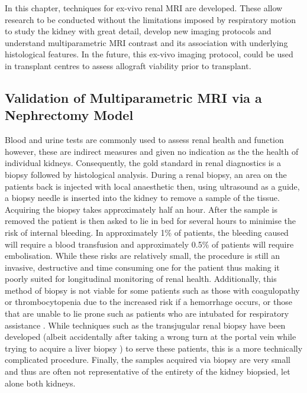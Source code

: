 In this chapter, techniques for ex-vivo renal \ac{MRI} are developed. These allow research to be conducted without the limitations imposed by respiratory motion to study the kidney with great detail, develop new imaging protocols and understand multiparametric \ac{MRI} contrast and its association with underlying histological features. In the future, this ex-vivo imaging protocol, could be used in transplant centres to assess allograft viability prior to transplant.

\subsection{Validation of Multiparametric MRI via a Nephrectomy Model}

Blood and urine tests are commonly used to assess renal health and function however, these are indirect measures and given no indication as the the health of individual kidneys. Consequently, the gold standard in renal diagnostics is a biopsy followed by histological analysis. During a renal biopsy, an area on the patients back is injected with local anaesthetic then, using ultrasound as a guide, a biopsy needle is inserted into the kidney to remove a sample of the tissue. Acquiring the biopsy takes approximately half an hour. After the sample is removed the patient is then asked to lie in bed for several hours to minimise the risk of internal bleeding. In approximately 1\% of patients, the bleeding caused will require a blood transfusion and approximately 0.5\% of patients will require embolisation. While these risks are relatively small, the procedure is still an invasive, destructive and time consuming one for the patient thus making it poorly suited for longitudinal monitoring of renal health. Additionally, this method of biopsy is not viable for some patients such as those with coagulopathy or thrombocytopenia due to the increased risk if a hemorrhage occurs, or those that are unable to lie prone such as patients who are intubated for respiratory assistance \cite{rathod_safety_2017}. While techniques such as the transjugular renal biopsy have been developed (albeit accidentally after taking a wrong turn at the portal vein while trying to acquire a liver biopsy \cite{mal_transjugular_1990}) to serve these patients, this is a more technically complicated procedure. Finally, the samples acquired via biopsy are very small and thus are often not representative of the entirety of the kidney biopsied, let alone both kidneys.

